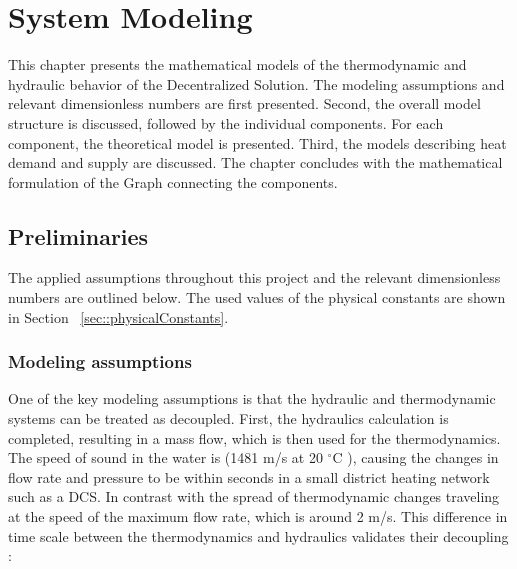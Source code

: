 \chapter{System Modeling}\label{chapter:sysmodel}

This chapter presents the mathematical models of the thermodynamic and hydraulic behavior of the Decentralized Solution. The modeling assumptions and relevant dimensionless numbers are first presented. Second, the overall model structure is discussed, followed by the individual components. For each component, the theoretical model is presented. Third, the models describing heat demand and supply are discussed. The chapter concludes with the mathematical formulation of the Graph connecting the components. 


\section{Preliminaries}\label{sec::preliminaries}
The applied assumptions throughout this project and the relevant dimensionless numbers are outlined below. The used values of the physical constants are shown in Section ~\ref{sec::physicalConstants}. 


\subsection{Modeling assumptions}
One of the key modeling assumptions is that the hydraulic and thermodynamic systems can be treated as decoupled. First, the hydraulics calculation is completed, resulting in a mass flow, which is then used for the thermodynamics. The speed of sound in the water is (1481 m/s at 20 $^{\circ}\text{C}$ \cite{speedofsound}), causing the changes in flow rate and pressure to be within seconds in a small district heating network such as a DCS. In contrast with the spread of thermodynamic changes traveling at the speed of the maximum flow rate, which is around 2 m/s. This difference in time scale between the thermodynamics and hydraulics validates their decoupling \cite{KUNTUAROVA}:

